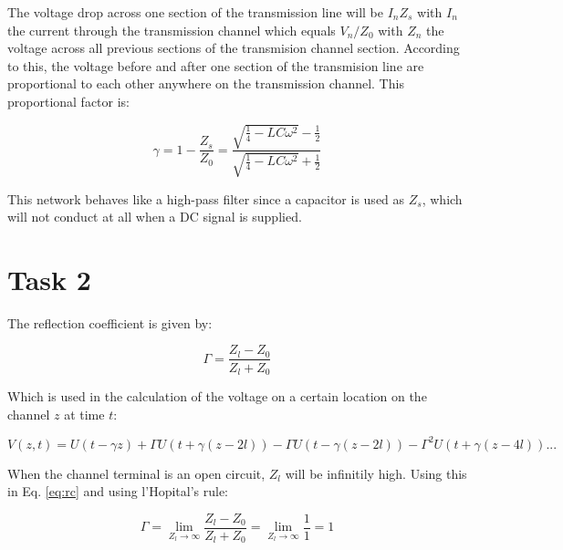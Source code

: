 \documentclass[final]{scrreprt} %
\begin{document}
The voltage drop across one section of the transmission line will be $I_n Z_s$ with $I_n$ the current through the transmission channel which equals $V_n / Z_0$ with $Z_n$ the voltage across all previous sections of the transmision channel section. According to this, the voltage before and after one section of the transmision line are proportional to each other anywhere on the transmission channel. This proportional factor is:


\begin{equation}
	\gamma = 1 - \frac{Z_s}{Z_0} = \frac{\sqrt{\frac{1}{4} - LC \omega^2} - \frac{1}{2}}{\sqrt{\frac{1}{4} - LC \omega^2} + \frac{1}{2}}
\end{equation}

This network behaves like a high-pass filter since a capacitor is used as $Z_s$, which will not conduct at all when a DC signal is supplied.

\section{Task 2}
The reflection coefficient is given by:

\begin{equation}
	\Gamma = \frac{Z_l - Z_0}{Z_l + Z_0}
\label{eq:rc}
\end{equation}

Which is used in the calculation of the voltage on a certain location on the channel $z$ at time $t$:

\begin{equation}
	V(z,t) = U(t - \gamma z) + \Gamma U(t + \gamma(z - 2l)) - \Gamma U(t - \gamma(z - 2l)) - \Gamma^2 U(t + \gamma(z - 4l)) ...
\label{eq:v}
\end{equation}

When the channel terminal is an open circuit, $Z_l$ will be infinitily high. Using this in Eq. \ref{eq:rc} and using l'Hopital's rule:

\begin{equation}
	\Gamma = \lim_{Z_l \to \infty} \frac{Z_l - Z_0}{Z_l + Z_0} = \lim_{Z_l \to \infty} \frac{1}{1} = 1
\end{equation}
\end{document}
